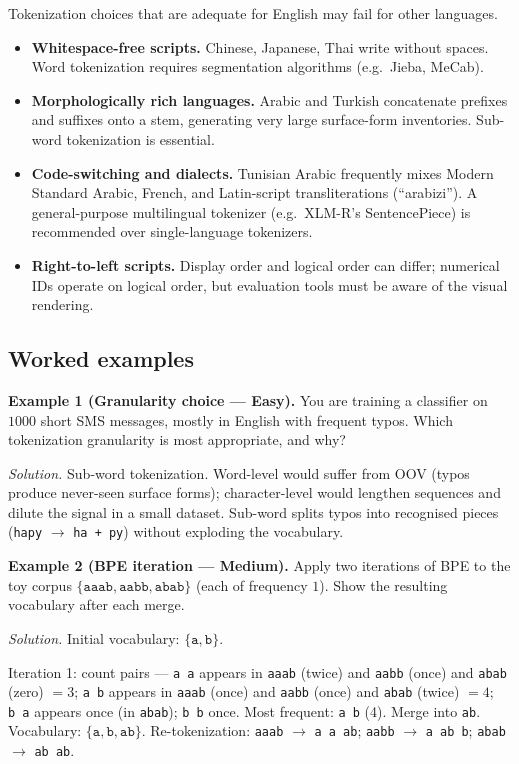 \documentclass[12pt,a4paper]{report}
\theoremstyle{definition}
\theoremstyle{remark}
\begin{document}
Tokenization choices that are adequate for English may fail for other languages.

\begin{itemize}
    \item \textbf{Whitespace-free scripts.} Chinese, Japanese, Thai write without spaces. Word tokenization requires segmentation algorithms (e.g.\ Jieba, MeCab).
    \item \textbf{Morphologically rich languages.} Arabic and Turkish concatenate prefixes and suffixes onto a stem, generating very large surface-form inventories. Sub-word tokenization is essential.
    \item \textbf{Code-switching and dialects.} Tunisian Arabic frequently mixes Modern Standard Arabic, French, and Latin-script transliterations (``arabizi''). A general-purpose multilingual tokenizer (e.g.\ XLM-R's SentencePiece) is recommended over single-language tokenizers.
    \item \textbf{Right-to-left scripts.} Display order and logical order can differ; numerical IDs operate on logical order, but evaluation tools must be aware of the visual rendering.
\end{itemize}

\subsection{Worked examples}

\textbf{Example 1 (Granularity choice --- Easy).}
You are training a classifier on $1000$ short SMS messages, mostly in English with frequent typos. Which tokenization granularity is most appropriate, and why?

\textit{Solution.} Sub-word tokenization. Word-level would suffer from OOV (typos produce never-seen surface forms); character-level would lengthen sequences and dilute the signal in a small dataset. Sub-word splits typos into recognised pieces (\texttt{hapy} $\to$ \texttt{ha + py}) without exploding the vocabulary.

\medskip

\textbf{Example 2 (BPE iteration --- Medium).}
Apply two iterations of BPE to the toy corpus $\{\texttt{aaab}, \texttt{aabb}, \texttt{abab}\}$ (each of frequency $1$). Show the resulting vocabulary after each merge.

\textit{Solution.} Initial vocabulary: $\{\texttt{a}, \texttt{b}\}$.

Iteration 1: count pairs --- \texttt{a\,a} appears in \texttt{aaab} (twice) and \texttt{aabb} (once) and \texttt{abab} (zero) $= 3$; \texttt{a\,b} appears in \texttt{aaab} (once) and \texttt{aabb} (once) and \texttt{abab} (twice) $= 4$; \texttt{b\,a} appears once (in \texttt{abab}); \texttt{b\,b} once.
Most frequent: \texttt{a\,b} (4). Merge into \texttt{ab}. Vocabulary: $\{\texttt{a}, \texttt{b}, \texttt{ab}\}$. Re-tokenization: \texttt{aaab} $\to$ \texttt{a\,a\,ab}; \texttt{aabb} $\to$ \texttt{a\,ab\,b}; \texttt{abab} $\to$ \texttt{ab\,ab}.
\end{document}
